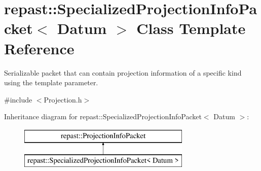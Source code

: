 \hypertarget{classrepast_1_1_specialized_projection_info_packet}{\section{repast\-:\-:Specialized\-Projection\-Info\-Packet$<$ Datum $>$ Class Template Reference}
\label{classrepast_1_1_specialized_projection_info_packet}
}


Serializable packet that can contain projection information of a specific kind using the template parameter.  




{\ttfamily \#include $<$Projection.\-h$>$}

Inheritance diagram for repast\-:\-:Specialized\-Projection\-Info\-Packet$<$ Datum $>$\-:\begin{figure}[H]
\begin{center}
\leavevmode
\includegraphics[height=2.000000cm]{classrepast_1_1_specialized_projection_info_packet}
\end{center}
\end{figure}
